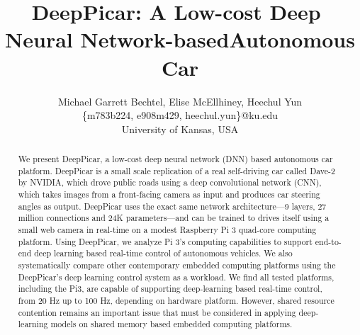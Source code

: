 \documentclass[10pt, conference]{IEEEtran}
\begin{document}
\title{DeepPicar:​ ​A​ ​Low-cost​ ​Deep​ ​Neural​ ​Network-based​ ​Autonomous​ ​Car}
\author{Michael Garrett Bechtel, Elise McEllhiney, Heechul Yun\\
\{m783b224, e908m429, heechul.yun\}@ku.edu\\
University of Kansas, USA\\ 
}

\maketitle
\thispagestyle{empty}
\begin{abstract}
We present DeepPicar, a low-cost deep neural network (DNN) based
autonomous car platform. DeepPicar is a small scale
replication of a real self-driving car called Dave-2 by NVIDIA, which
drove public roads using a deep convolutional network (CNN), which
takes images from a front-facing camera as input and produces
car steering angles as output. DeepPicar uses the exact same network
architecture---9 layers, 27 million connections and 24K
parameters---and can be trained to drives itself using a small web
camera in real-time on a modest Raspberry Pi 3 quad-core computing
platform. Using DeepPicar, we analyze Pi 3's computing capabilities to 
support end-to-end deep learning based real-time control of autonomous
vehicles. We also systematically compare other contemporary embedded
computing platforms using the DeepPicar's deep learning control system
as a workload.
We find all tested platforms, including the Pi3, are capable of
supporting deep-learning based real-time control, from 20 Hz up to 100
Hz, depending on hardware platform. 
However, shared resource contention remains an
important issue that must be considered in applying deep-learning
models on shared memory based embedded computing platforms.

\end{abstract}






% 




\appendix

\end{document}
